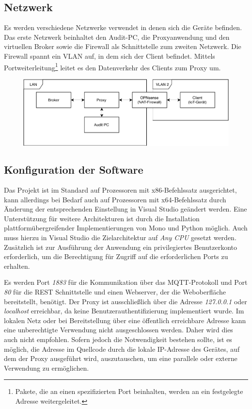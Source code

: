     \subsection{Netzwerk}
    Es werden verschiedene Netzwerke verwendet in denen sich die Geräte befinden. 
    Das erste Netzwerk beinhaltet den Audit-PC, die Proxyanwendung und den virtuellen Broker sowie die Firewall als Schnittstelle zum zweiten Netzwerk.
    Die Firewall spannt ein \ac{VLAN} auf, in dem sich der Client befindet. Mittels Portweiterleitung\footnote{Pakete, die an einen spezifizierten Port beinhalten, werden an ein festgelegte Adresse weitergeleitet.} leitet es den Datenverkehr des Clients zum Proxy um.
    
    \begin{figure}[h]%
        \centering
        \includegraphics[width=14cm]{tex/bilder/6_validierung/Netzwerkdiagramm.pdf}
        \label{fig:virtuelles_netzwerk}
    \end{figure}
    
    \subsection{Konfiguration der Software} \label{KonfigurationDerSoftware}
    Das Projekt ist im Standard auf Prozessoren mit x86-Befehlssatz ausgerichtet, kann allerdings bei Bedarf auch auf Prozessoren mit x64-Befehlssatz durch Änderung der entsprechenden Einstellung in Visual Studio geändert werden.
    Eine Unterstützung für weitere Architekturen ist durch die Installation plattformübergreifender Implementierungen von Mono und Python möglich. Auch muss hierzu in Visual Studio die Zielarchitektur auf \emph{Any CPU} gesetzt werden. 
    Zusätzlich ist zur Ausführung der Anwendung ein privilegiertes Benutzerkonto erforderlich, um die Berechtigung für Zugriff auf die erforderlichen Ports zu erhalten.
    
    Es werden Port \emph{1883} für die Kommunikation über das \ac{MQTT}-Protokoll und Port \emph{80} für die \ac{REST} Schnittstelle und einen Webserver, der die Weboberfläche bereitstellt, benötigt.
    Der Proxy ist ausschließlich über die Adresse \emph{127.0.0.1} oder \emph{localhost} erreichbar, da keine Benutzerauthentifizierung implementiert wurde. Im lokalen Netz oder bei Bereitstellung über eine öffentlich erreichbare Adresse kann eine unberechtigte Verwendung nicht ausgeschlossen werden. Daher wird dies auch nicht empfohlen. Sofern jedoch die Notwendigkeit bestehen sollte, ist es möglich, die Adresse im Quellcode durch die lokale IP-Adresse des Gerätes, auf dem der Proxy ausgeführt wird, auszutauschen, um eine parallele oder externe Verwendung zu ermöglichen.

